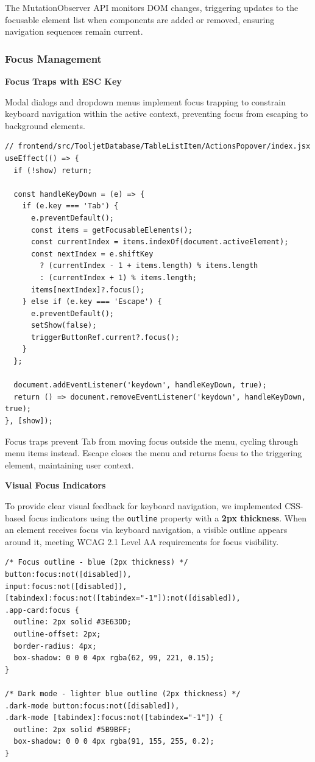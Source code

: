 The MutationObserver API monitors DOM changes, triggering updates to the focusable element list when components are added or removed, ensuring navigation sequences remain current.

\subsubsection{Focus Management}

\textbf{Focus Traps with ESC Key}

Modal dialogs and dropdown menus implement focus trapping to constrain keyboard navigation within the active context, preventing focus from escaping to background elements.

\begin{lstlisting}[caption=Menu Focus Trap Implementation, label=lst:focus-trap]
// frontend/src/TooljetDatabase/TableListItem/ActionsPopover/index.jsx
useEffect(() => {
  if (!show) return;
  
  const handleKeyDown = (e) => {
    if (e.key === 'Tab') {
      e.preventDefault();
      const items = getFocusableElements();
      const currentIndex = items.indexOf(document.activeElement);
      const nextIndex = e.shiftKey 
        ? (currentIndex - 1 + items.length) % items.length
        : (currentIndex + 1) % items.length;
      items[nextIndex]?.focus();
    } else if (e.key === 'Escape') {
      e.preventDefault();
      setShow(false);
      triggerButtonRef.current?.focus();
    }
  };
  
  document.addEventListener('keydown', handleKeyDown, true);
  return () => document.removeEventListener('keydown', handleKeyDown, true);
}, [show]);
\end{lstlisting}

Focus traps prevent Tab from moving focus outside the menu, cycling through menu items instead. Escape closes the menu and returns focus to the triggering element, maintaining user context.

\textbf{Visual Focus Indicators}

To provide clear visual feedback for keyboard navigation, we implemented CSS-based focus indicators using the \texttt{outline} property with a \textbf{2px thickness}. When an element receives focus via keyboard navigation, a visible outline appears around it, meeting WCAG 2.1 Level AA requirements for focus visibility.

\begin{lstlisting}[caption=Keyboard Focus Visual Indicators, label=lst:focus-indicator]
/* Focus outline - blue (2px thickness) */
button:focus:not([disabled]),
input:focus:not([disabled]),
[tabindex]:focus:not([tabindex="-1"]):not([disabled]),
.app-card:focus {
  outline: 2px solid #3E63DD;
  outline-offset: 2px;
  border-radius: 4px;
  box-shadow: 0 0 0 4px rgba(62, 99, 221, 0.15);
}

/* Dark mode - lighter blue outline (2px thickness) */
.dark-mode button:focus:not([disabled]),
.dark-mode [tabindex]:focus:not([tabindex="-1"]) {
  outline: 2px solid #5B9BFF;
  box-shadow: 0 0 0 4px rgba(91, 155, 255, 0.2);
}
\end{lstlisting}

